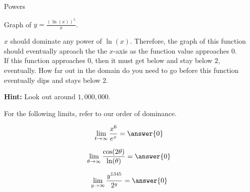 \documentclass{ximera}
\begin{document}
\begin{example} Powers


Graph of $y = \frac{(\ln(x))^5}{x}$.

$x$ should dominate any power of $\ln(x)$.  Therefore, the graph of this function should eventually aproach the the $x$-axis as the function value approaches $0$. \\


If this function approaches $0$, then it must get below and stay below $2$, eventually. How far out in the domain do you need to go before this function eventually dips and stays below $2$.


\begin{center}
\end{center}




\textbf{Hint:} Look out around $1,000,000$.

\end{example}







For the following limits, refer to our order of dominance.

\begin{question}

\[
\lim\limits_{t \to \infty} \frac{x^6}{e^x} = \answer{0}
\]

\end{question}









\begin{question}

\[
\lim\limits_{\theta \to \infty} \frac{\cos(2 \theta)}{\ln(\theta)} = \answer{0}
\]

\end{question}









\begin{question}

\[
\lim\limits_{y \to \infty} \frac{y^{1345}}{2^y} = \answer{0}
\]

\end{question}
\end{document}

